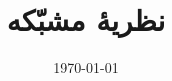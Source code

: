 \documentclass[12pt]{article}
\begin{document}
\title{نظریهٔ مشبّکه}
\author{}
\date{\today}

\maketitle

\end{document}
